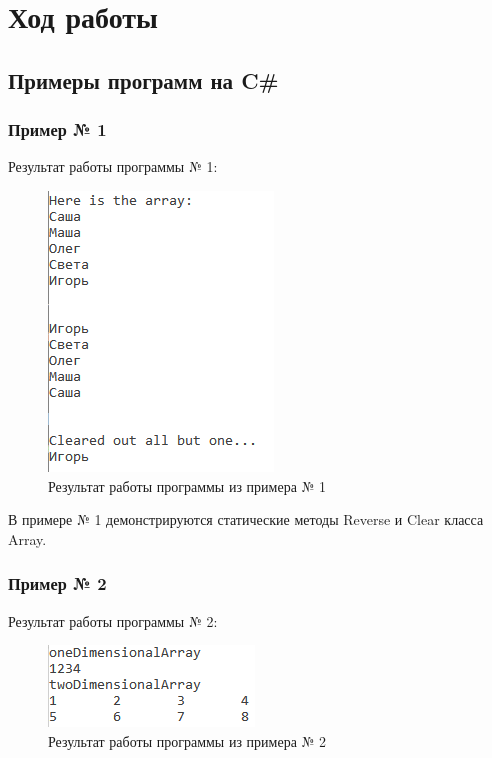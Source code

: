 \documentclass[a4paper,14pt]{extarticle}
\begin{document}
    \section{Ход работы}

    \subsection{Примеры программ на C\#}

    \subsubsection{Пример № 1}

    Результат работы программы № 1:

    \begin{figure}[H]
        \centering
        \includegraphics[width=.4\textwidth]{Example1}
        \caption{Результат работы программы из примера № 1}
    \end{figure}

    В примере № 1 демонстрируются статические методы Reverse и Clear
    класса Array.

    \subsubsection{Пример № 2}

    Результат работы программы № 2:

    \begin{figure}[H]
        \centering
        \includegraphics[width=.4\textwidth]{Example2}
        \caption{Результат работы программы из примера № 2}
    \end{figure}
\end{document}
